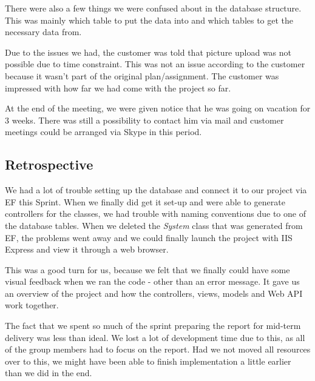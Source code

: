 There were also a few things we were confused about in the database structure. This was mainly which table to put the data into and which tables to get the necessary data from.

Due to the issues we had, the customer was told that picture upload was not possible due to time constraint. This was not an issue according to the customer because it wasn't part of the original plan/assignment. The customer was impressed with how far we had come with the project so far.

At the end of the meeting, we were given notice that he was going on vacation for 3 weeks. There was still a possibility to contact him via mail and customer meetings could be arranged via Skype in this period.

\subsection{Retrospective}
We had a lot of trouble setting up the database and connect it to our project via EF this Sprint. When we finally did get it set-up and were able to generate controllers for the classes, we had trouble with naming conventions due to one of the database tables. When we deleted the \emph{System} class that was generated from EF, the problems went away and we could finally launch the project with IIS Express and view it through a web browser.

This was a good turn for us, because we felt that we finally could have some visual feedback when we ran the code - other than an error message. It gave us an overview of the project and how the controllers, views, models and Web API work together.

The fact that we spent so much of the sprint preparing the report for mid-term delivery was less than ideal. We lost a lot of development time due to this, as all of the group members had to focus on the report. Had we not moved all resources over to this, we might have been able to finish implementation a little earlier than we did in the end.